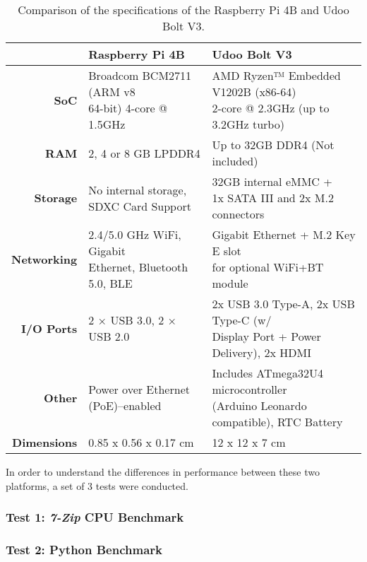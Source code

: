\renewcommand{\arraystretch}{2}
\begin{table}[H]
    \centering
    \begin{tabular}{r|l|l}
        & \textbf{Raspberry Pi 4B}& \textbf{Udoo Bolt V3}  \\ \hline
        \textbf{SoC} &  \makecell{Broadcom BCM2711 (ARM v8 \\ 64-bit) 4-core @ 1.5GHz} & \makecell{AMD Ryzen™ Embedded V1202B (x86-64) \\ 2-core @ 2.3GHz (up to 3.2GHz turbo)}\\
        \textbf{RAM} & 2, 4 or 8 GB LPDDR4 & Up to 32GB DDR4 (Not included) \\ 
        \textbf{Storage} & \makecell{No internal storage, \\ SDXC Card Support} & \makecell{32GB internal eMMC + \\1x SATA III and 2x M.2 connectors}\\
        \textbf{Networking} & \makecell{2.4/5.0 GHz WiFi, Gigabit \\ Ethernet, Bluetooth 5.0, BLE} & \makecell{Gigabit Ethernet + M.2 Key E slot \\ for optional WiFi+BT module}\\ 
        \textbf{I/O Ports} & 2 × USB 3.0, 2 × USB 2.0 & \makecell{2x USB 3.0 Type-A, 2x USB Type-C (w/ \\ Display Port + Power Delivery), 2x HDMI} \\
        \textbf{Other} & Power over Ethernet (PoE)–enabled & \makecell{Includes ATmega32U4 microcontroller\\ (Arduino Leonardo compatible), RTC Battery} \\   
        \textbf{Dimensions} & 0.85 x 0.56 x 0.17 cm & 12 x 12 x 7 cm \\
    \end{tabular}
    \caption{Comparison of the specifications of the Raspberry Pi 4B and Udoo Bolt V3.}
    \label{tab:comparsion-hardwareplatform}
\end{table}



In order to understand the differences in performance between these two platforms, a set of 3 tests were conducted.

\subsubsection{Test 1: \textit{7-Zip} CPU Benchmark}
\subsubsection{Test 2: Python Benchmark}
